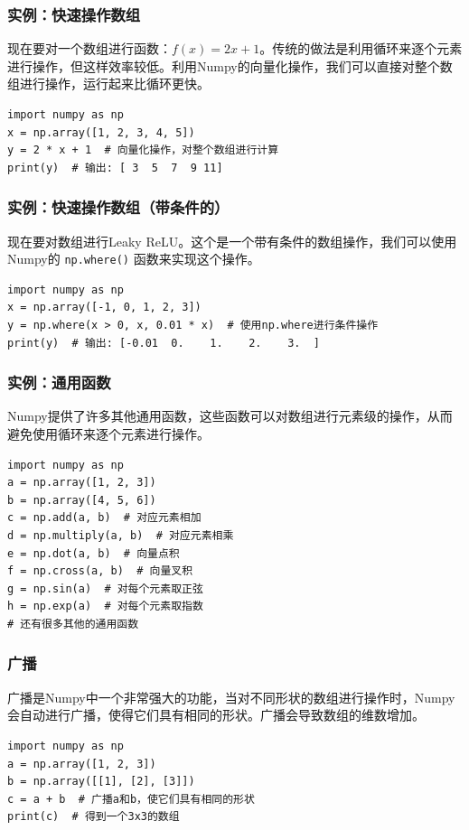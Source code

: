 \begin{frame}[fragile]
    \frametitle{实例：快速操作数组}

    现在要对一个数组进行函数：$f(x) = 2x + 1$。传统的做法是利用循环来逐个元素进行操作，但这样效率较低。利用Numpy的向量化操作，我们可以直接对整个数组进行操作，运行起来比循环更快。

    \begin{verbatim}
import numpy as np
x = np.array([1, 2, 3, 4, 5])
y = 2 * x + 1  # 向量化操作，对整个数组进行计算
print(y)  # 输出: [ 3  5  7  9 11]
    \end{verbatim}

\end{frame}

\begin{frame}[fragile]
    \frametitle{实例：快速操作数组（带条件的）}

    现在要对数组进行Leaky ReLU。这个是一个带有条件的数组操作，我们可以使用Numpy的 \texttt{np.where()} 函数来实现这个操作。

    \begin{verbatim}
import numpy as np
x = np.array([-1, 0, 1, 2, 3])
y = np.where(x > 0, x, 0.01 * x)  # 使用np.where进行条件操作
print(y)  # 输出: [-0.01  0.    1.    2.    3.  ]
    \end{verbatim}

\end{frame}

\begin{frame}[fragile]
    \frametitle{实例：通用函数}

    Numpy提供了许多其他通用函数，这些函数可以对数组进行元素级的操作，从而避免使用循环来逐个元素进行操作。

    \begin{verbatim}
import numpy as np
a = np.array([1, 2, 3])
b = np.array([4, 5, 6])
c = np.add(a, b)  # 对应元素相加
d = np.multiply(a, b)  # 对应元素相乘
e = np.dot(a, b)  # 向量点积
f = np.cross(a, b)  # 向量叉积
g = np.sin(a)  # 对每个元素取正弦
h = np.exp(a)  # 对每个元素取指数
# 还有很多其他的通用函数
    \end{verbatim}

\end{frame}

\begin{frame}[fragile]
    \frametitle{广播}
    广播是Numpy中一个非常强大的功能，当对不同形状的数组进行操作时，Numpy会自动进行广播，使得它们具有相同的形状。广播会导致数组的维数增加。
    \begin{verbatim}
import numpy as np
a = np.array([1, 2, 3])
b = np.array([[1], [2], [3]])
c = a + b  # 广播a和b，使它们具有相同的形状
print(c)  # 得到一个3x3的数组
    \end{verbatim}

\end{frame}

